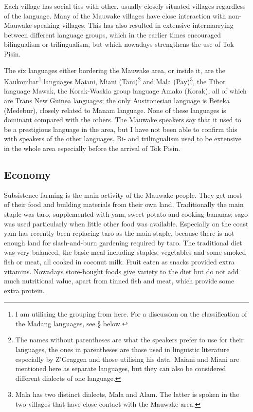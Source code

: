 Each village has social ties with other, usually closely situated villages regardless of the language.  Many of the Mauwake villages have close interaction with non-Mauwake-speaking villages.  This has also resulted in extensive intermarrying between different language groups, which in the earlier times encouraged bilingualism or trilingualism, but which nowadays strengthens the use of Tok Pisin.

The six languages either bordering the Mauwake area, or inside it, are the Kaukombar\footnote{I am utilising the grouping from   here. For a discussion on the classification of the Madang languages, see {\S} below.} languages Maiani, Miani (Tani)\footnote{The names without parentheses are what the speakers prefer to use for their languages, the ones in parentheses are those used in linguistic literature especially by Z'Graggen and those utilising his data. Maiani and Miani are mentioned here as separate languages, but they can also be considered different dialects of one language.}  and Mala (Pay)\footnote{Mala has two distinct dialects, Mala and Alam. The latter is spoken in the two villages that have close contact with the Mauwake area.}, the Tibor language Mawak, the Korak-Waskia group language Amako (Korak), all of which are Trans New Guinea languages; the only Austronesian language is Beteka (Medebur), closely related to Manam language. None of these languages is dominant compared with the others.  The Mauwake speakers say that it used to be a prestigious language in the area, but I have not been able to confirm this with speakers of the other languages. Bi- and trilingualism used to be extensive in the whole area especially before the arrival of Tok Pisin. 


\subsection{Economy}
Subsistence farming is the main activity of the Mauwake people. They get most of their food and building materials from their own land.  Traditionally the main staple was taro, supplemented with yam, sweet potato and cooking bananas; sago was used particularly when little other food was available. Especially on the coast yam has recently been replacing taro as the main staple, because there is not enough land for slash-and-burn gardening required by taro. The traditional diet was very balanced, the basic meal including staples, vegetables and some smoked fish or meat, all cooked in coconut milk. Fruit eaten as snacks provided extra vitamins. Nowadays store-bought foods give variety to the diet but do not add much nutritional value, apart from tinned fish and meat, which provide some extra protein.

